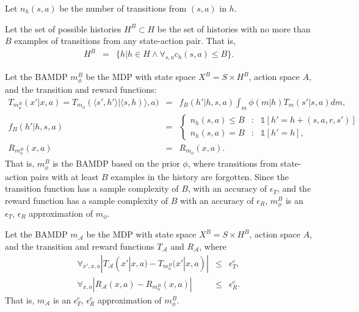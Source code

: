 \begin{defn}
Let $n_h(s,a)$ be the number of transitions from $(s,a)$ in $h$.
\end{defn}

\begin{defn}
Let the set of possible histories $H^B \subset H$ be the set of histories with no more than $B$ examples of transitions from any state-action pair. That is, 
\begin{eqnarray}
H^B&=&\{h|h\in H\wedge \forall_{s,a} c_h(s,a) \leq B\}.
\end{eqnarray}
\end{defn}

\begin{defn}
Let the BAMDP $m_\phi^B$ be the MDP with state space $X^B = S\times H^B$, action space $A$, and the transition and reward functions:
\begin{eqnarray}
T_{m_\phi^B}(x'|x,a)= T_{m_\phi}(\langle s', h'\rangle|\langle s, h)\rangle, a) &=& f_B(h'|h,s,a) \int_m \phi(m|h)T_m(s'|s,a) dm,\\
f_B(h'|h,s,a) &=& \left\{\begin{array}{lll}
n_h(s,a)\leq B&:& \mathbb{1}[h'=h+(s,a,r,s')]\\
n_h(s,a) = B&:& \mathbb{1}[h'=h],
\end{array}\right.\\
R_{m_\phi^B}(x,a) &=& R_{m_\phi}(x, a).
\end{eqnarray}
That is, $m_\phi^B$ is the BAMDP based on the prior $\phi$, where transitions from state-action pairs with at least $B$ examples in the history are forgotten. Since the transition function has a sample complexity of $B$, with an accuracy of $\epsilon_T$, and the reward function has a sample complexity of $B$ with an accuracy of $\epsilon_R$, $m_\phi^B$ is an $\epsilon_T$, $\epsilon_R$ approximation of $m_\phi$.
\end{defn}

\begin{defn}
Let the BAMDP $m_\mathcal{A}$ be the MDP with state space $X^B = S\times H^B$, action space $A$, and the transition and reward functions $T_\mathcal{A}$ and $R_\mathcal{A}$,
where
\begin{eqnarray}
\forall_{x',x,a} |T_\mathcal{A}(x'|x,a) - T_{m_\phi^B}(x'|x,a)| &\leq& \epsilon^c_T,\\
\forall_{x,a} |R_\mathcal{A}(x,a) - R_{m_\phi^B}(x,a)| &\leq& \epsilon^c_R.
\end{eqnarray}
That is, $m_\mathcal{A}$ is an $\epsilon^c_T$, $\epsilon^c_R$ approximation of $m_\phi^B$.
\end{defn}

